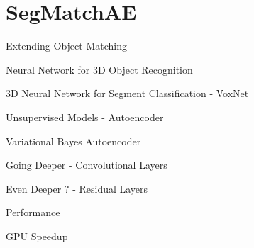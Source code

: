 \chapter{SegMatchAE}
\label{sec:segmatchAE}

Extending Object Matching

Neural Network for 3D Object Recognition

3D Neural Network for Segment Classification - VoxNet

Unsupervised Models - Autoencoder

Variational Bayes Autoencoder

Going Deeper - Convolutional Layers

Even Deeper ? - Residual Layers

Performance

GPU Speedup

